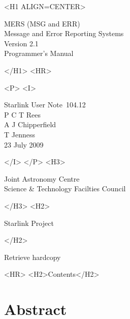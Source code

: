 \documentclass[twoside,11pt]{article}
\newcommand{\stardoccategory}  {Starlink User Note}
\newcommand{\stardocsource}    {sun\stardocnumber}
\newcommand{\stardocnumber}    {104.12}
\newcommand{\stardocauthors}   {P C T Rees \\
                                A J Chipperfield \\
                                T Jenness}
\newcommand{\stardocdate}      {23 July 2009}
\newcommand{\stardoctitle}     {MERS (MSG and ERR)\\ [1ex]
                                Message and Error Reporting Systems}
\newcommand{\stardocversion}   {Version 2.1}
\newcommand{\stardocmanual}    {Programmer's Manual}
\newcommand{\htmladdnormallink}[2]{#1}
\newcommand{\htmladdimg}[1]{}
\newcommand{\htmlref}[2]{#1}
\newcommand{\htmladdtonavigation}[1]{}
\newcommand{\xlabel}[1]{}
\renewcommand{\_}{\texttt{\symbol{95}}}
\begin{document}
\begin{htmlonly}
   \xlabel{}
   \begin{rawhtml} <H1 ALIGN=CENTER> \end{rawhtml}
      \stardoctitle\\
      \stardocversion\\
      \stardocmanual
   \begin{rawhtml} </H1> <HR> \end{rawhtml}


   \begin{rawhtml} <P> <I> \end{rawhtml}
   \stardoccategory\ \stardocnumber \\
   \stardocauthors \\
   \stardocdate
   \begin{rawhtml} </I> </P> <H3> \end{rawhtml}
      \htmladdnormallink{Joint Astronomy Centre}
                        {http://www.jach.hawaii.edu} \\
      \htmladdnormallink{Science \& Technology Facilties Council}
                        {http://www.scitech.ac.uk} \\
   \begin{rawhtml} </H3> <H2> \end{rawhtml}
      \htmladdnormallink{Starlink Project}{http://starlink.jach.hawaii.edu/}
   \begin{rawhtml} </H2> \end{rawhtml}
   \htmladdnormallink{\htmladdimg{source.gif} Retrieve hardcopy}
      {http://starlink.jach.hawaii.edu/cgi-bin/hcserver?\stardocsource}\\

  \label{stardoccontents}
  \begin{rawhtml} 
    <HR>
    <H2>Contents</H2>
  \end{rawhtml}
  \htmladdtonavigation{\htmlref{\htmladdimg{contents_motif.gif}}
        {stardoccontents}}

  \section{\xlabel{abstract}Abstract}
\end{htmlonly}
\end{document}
